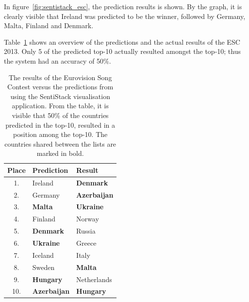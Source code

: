 In figure~\ref{fig:sentistack_esc}, the prediction results is shown. By the graph, it is clearly visible that Ireland was predicted to be the winner, followed by Germany, Malta, Finland and Denmark.

Table~\ref{tab:esc_results} shows an overview of the predictions and the actual results of the ESC 2013. Only 5 of the predicted top-10 actually resulted amongst the top-10; thus the system had an accuracy of 50\%. 

\begin{table}

\centering
\begin{tabular}{|c|l|l|} 
\hline
 Place	&  Prediction	& Result  \\ \hline \hline

1. & Ireland & \textbf{Denmark}      \\ \hline
2. & Germany & \textbf{Azerbaijan}   \\ \hline
3. & \textbf{Malta} & \textbf{Ukraine}      \\ \hline
4. & Finland & Norway       \\ \hline
5. & \textbf{Denmark} & Russia       \\ \hline
6. & \textbf{Ukraine} & Greece       \\ \hline
7. & Iceland & Italy        \\ \hline
8. & Sweden & \textbf{Malta}        \\ \hline
9. & \textbf{Hungary} & Netherlands  \\ \hline
10. & \textbf{Azerbaijan} & \textbf{Hungary}  \\ \hline

\end{tabular}

\caption[Eurovision Song Contest experiment result]{The results of the Eurovision Song Contest versus the predictions from using the SentiStack visualisation application. From the table, it is visible that 50\% of the countries predicted in the top-10, resulted in a position among the top-10. The countries shared between the lists are marked in bold.}
\label{tab:esc_results}
\end{table}

